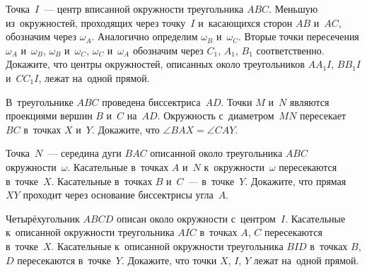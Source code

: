 \begin{problems}
\item
Точка~$I$~--- центр вписанной окружности треугольника $ABC$.
Меньшую из~окружностей, проходящих через точку~$I$ и~касающихся
сторон $AB$ и~$AC$, обозначим через $\omega_{A}$.
Аналогично определим $\omega_{B}$ и~$\omega_{C}$.
Вторые точки пересечения
$\omega_{A}$ и~$\omega_{B}$,
$\omega_{B}$ и~$\omega_{C}$,
$\omega_{C}$ и~$\omega_{A}$
обозначим через $C_{1}$, $A_{1}$, $B_{1}$ соответственно.
Докажите, что центры окружностей, описанных около
треугольников $AA_{1}I$, $BB_{1}I$ и~$CC_{1}I$, лежат на~одной прямой.

\item
В~треугольнике $ABC$ проведена биссектриса~$AD$.
Точки $M$ и~$N$ являются проекциями вершин $B$ и~$C$ на~$AD$.
Окружность с~диаметром~$MN$ пересекает $BC$ в~точках $X$ и~$Y$.
Докажите, что $\angle BAX = \angle CAY$.

\item
Точка~$N$~--- середина дуги $BAC$ описанной около треугольника $ABC$
окружности~$\omega$.
Касательные в~точках $A$ и~$N$ к~окружности~$\omega$ пересекаются в~точке~$X$.
Касательные в~точках $B$ и~$C$~--- в~точке~$Y$.
Докажите, что прямая~$XY$ проходит через основание биссектрисы угла~$A$.

\item
Четырёхугольник $ABCD$ описан около окружности с~центром~$I$.
Касательные к~описанной окружности треугольника $AIC$ в~точках $A$, $C$
пересекаются в~точке~$X$.
Касательные к~описанной окружности треугольника $BID$ в~точках $B$, $D$
пересекаются в~точке~$Y$.
Докажите, что точки $X$, $I$, $Y$ лежат на~одной прямой.

\end{problems}

